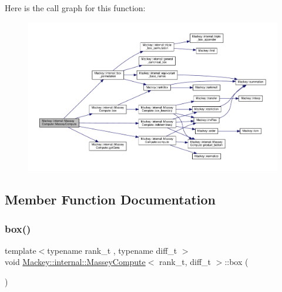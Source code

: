 Here is the call graph for this function\+:\nopagebreak
\begin{figure}[H]
\begin{center}
\leavevmode
\includegraphics[width=350pt]{structMackey_1_1internal_1_1MasseyCompute_a76235baafddad97e59b165f6ce56fa32_cgraph}
\end{center}
\end{figure}


\subsection{Member Function Documentation}
\mbox{\label{structMackey_1_1internal_1_1MasseyCompute_aff177659d2dbcd9c3fe9d644d55141ca}} 
\subsubsection{\texorpdfstring{box()}{box()}}
{\footnotesize\ttfamily template$<$typename rank\+\_\+t , typename diff\+\_\+t $>$ \\
void \hyperlink{structMackey_1_1internal_1_1MasseyCompute}{Mackey\+::internal\+::\+Massey\+Compute}$<$ rank\+\_\+t, diff\+\_\+t $>$\+::box (\begin{DoxyParamCaption}{ }\end{DoxyParamCaption})}


